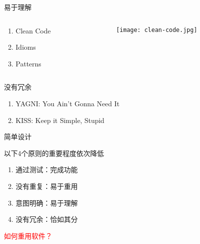 \begin{frame}{易于理解}
  \begin{columns} 
  \begin{column}{0.3\textwidth}
  \begin{enumerate}
    \item \alert{Clean Code}
    \item \alert{Idioms}
    \item \alert{Patterns}
  \end{enumerate}
  \end{column}  

  \begin{column}{0.7\textwidth}
  \begin{figure}
    \centering
    \texttt{[image: clean-code.jpg]}
  \end{figure}
  \end{column}
  \end{columns}   
\end{frame}

\begin{frame}{没有冗余}
  \begin{enumerate}
    \item \alert{YAGNI}: You Ain't Gonna Need It
    \item \alert{KISS}: Keep it Simple, Stupid
  \end{enumerate}
\end{frame}

\begin{frame}{简单设计}
  \begin{block}{以下4个原则的重要程度依次降低}
    \begin{enumerate}
    \item \alert{通过测试}：完成功能
    \item \alert{没有重复}：易于重用
    \item \alert{意图明确}：易于理解
    \item \alert{没有冗余}：恰如其分
    \end{enumerate}
  \end{block}
\end{frame}

\begin{frame}
  \begin{center}
    \huge{\textcolor{red}{如何重用软件？}}
  \end{center}
\end{frame}


